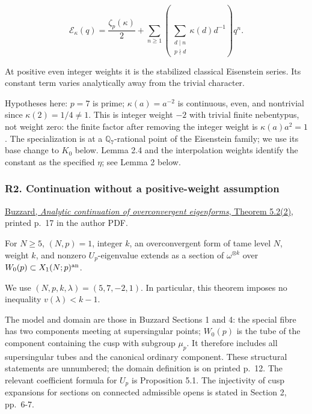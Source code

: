 \documentclass[11pt,a4paper]{article}
\begin{document}
\[
\mathcal E_\kappa(q)=\frac{\zeta_p(\kappa)}2+
\sum_{n\ge1}\left(\sum_{\substack{d\mid n\\p\nmid d}}\kappa(d)d^{-1}\right)q^n.
\tag{R2}
\]

At positive even integer weights it is the stabilized classical Eisenstein series. Its constant term varies analytically away from the trivial character.

Hypotheses here: \(p=7\) is prime; \(\kappa(a)=a^{-2}\) is continuous, even, and nontrivial since \(\kappa(2)=1/4\ne1\). This is integer weight \(-2\) with trivial finite nebentypus, not weight zero: the finite factor after removing the integer weight is \(\kappa(a)a^2=1\). The specialization is at a \(\mathbb Q_7\)-rational point of the Eisenstein family; we use its base change to \(K_0\) below. Lemma 2.4 and the interpolation weights identify the constant as the specified \(\eta\); see Lemma 2 below.

\hypertarget{r2.-continuation-without-a-positive-weight-assumption}{%
\subsubsection{R2. Continuation without a positive-weight assumption}\label{r2.-continuation-without-a-positive-weight-assumption}}

\href{https://www.ma.imperial.ac.uk/~buzzard/maths/research/papers/wild6.pdf}{Buzzard, \emph{Analytic continuation of overconvergent eigenforms}, Theorem 5.2(2)}, printed p.~17 in the author PDF.

For \(N\ge5\), \((N,p)=1\), integer \(k\), an overconvergent form of tame level \(N\), weight \(k\), and nonzero \(U_p\)-eigenvalue extends as a section of \(\omega^{\otimes k}\) over \(W_0(p)\subset X_1(N;p)^{\rm an}\).

We use \((N,p,k,\lambda)=(5,7,-2,1)\). In particular, this theorem imposes no inequality \(v(\lambda)<k-1\).

The model and domain are those in Buzzard Sections 1 and 4: the special fibre has two components meeting at supersingular points; \(W_0(p)\) is the tube of the component containing the cusp with subgroup \(\mu_p\). It therefore includes all supersingular tubes and the canonical ordinary component. These structural statements are unnumbered; the domain definition is on printed p.~12. The relevant coefficient formula for \(U_p\) is Proposition 5.1. The injectivity of cusp expansions for sections on connected admissible opens is stated in Section 2, pp.~6-7.
\end{document}
